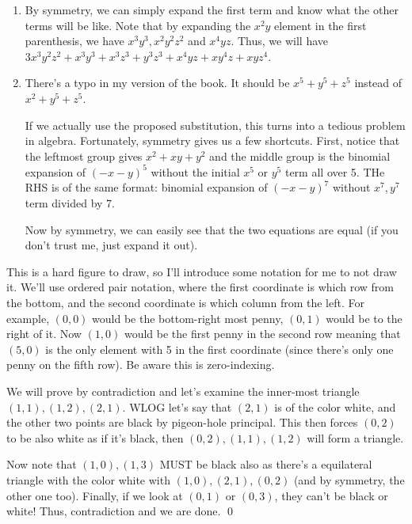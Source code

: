 \setcounter{Exercise}{5}

\begin{Exercise}
	\begin{enumerate}
		\item By symmetry, we can simply expand the first term and know what the other terms will be like.
		Note that by expanding the $x^2y$ element in the first parenthesis, we have $x^3y^3, x^2y^2z^2$ and $x^4yz$.
		Thus, we will have $3x^3y^2z^2 + x^3y^3 + x^3z^3 + y^3z^3 + x^4yz + xy^4z + xyz^4$.

		\item There's a typo in my version of the book.
		It should be $x^5 + y^5 + z^5$ instead of $x^2 + y^5 + z^5$.

		If we actually use the proposed substitution, this turns into a tedious problem in algebra.
		Fortunately, symmetry gives us a few shortcuts.
		First, notice that the leftmost group gives $x^2 + xy + y^2$ and the middle group is the binomial expansion of $(-x-y)^5$ without the initial $x^5$ or $y^5$ term all over 5. 
		THe RHS is of the same format: binomial expansion of $(-x-y)^7$ without $x^7, y^7$ term divided by 7.

		Now by symmetry, we can easily see that the two equations are equal (if you don't trust me, just expand it out).
	\end{enumerate}
\end{Exercise}

\begin{Exercise}
	This is a hard figure to draw, so I'll introduce some notation for me to not draw it. 
	We'll use ordered pair notation, where the first coordinate is which row from the bottom, and the second coordinate is which column from the left.
	For example, $(0,0)$ would be the bottom-right most penny, $(0,1)$ would be to the right of it.
	Now $(1,0)$ would be the first penny in the second row meaning that $(5,0)$ is the only element with 5 in the first coordinate (since there's only one penny on the fifth row).
	Be aware this is zero-indexing.

	We will prove by contradiction and let's examine the inner-most triangle $(1,1), (1,2), (2,1)$. 
	WLOG let's say that $(2,1)$ is of the color white, and the other two points are black by pigeon-hole principal.
	This then forces $(0,2)$ to be also white as if it's black, then $(0,2), (1,1), (1,2)$ will form a triangle.

	Now note that $(1, 0), (1, 3)$ MUST be black also as there's a equilateral triangle with the color white with $(1,0),(2,1),(0,2)$ (and by symmetry, the other one too).
	Finally, if we look at $(0,1)$ or $(0,3)$, they can't be black or white! 
	Thus, contradiction and we are done. \qed
\end{Exercise}